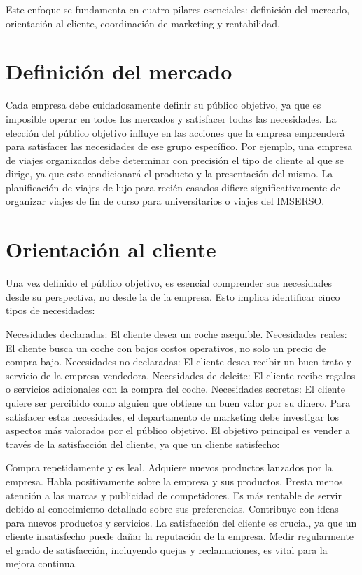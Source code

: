 \documentclass[
    a4paper, %
    10pt, %
    unnumberedsections, %
    twoside, %
]{LTJournalArticle}
\begin{document}
Este enfoque se fundamenta en cuatro pilares esenciales: definición del mercado, orientación al cliente, coordinación de marketing y rentabilidad.



\section{Definición del mercado}

Cada empresa debe cuidadosamente definir su público objetivo, ya que es imposible operar en todos los mercados y satisfacer todas las necesidades. La elección del público objetivo influye en las acciones que la empresa emprenderá para satisfacer las necesidades de ese grupo específico. Por ejemplo, una empresa de viajes organizados debe determinar con precisión el tipo de cliente al que se dirige, ya que esto condicionará el producto y la presentación del mismo. La planificación de viajes de lujo para recién casados difiere significativamente de organizar viajes de fin de curso para universitarios o viajes del IMSERSO.


\section{Orientación al cliente}

Una vez definido el público objetivo, es esencial comprender sus necesidades desde su perspectiva, no desde la de la empresa. Esto implica identificar cinco tipos de necesidades:

Necesidades declaradas: El cliente desea un coche asequible.
Necesidades reales: El cliente busca un coche con bajos costos operativos, no solo un precio de compra bajo.
Necesidades no declaradas: El cliente desea recibir un buen trato y servicio de la empresa vendedora.
Necesidades de deleite: El cliente recibe regalos o servicios adicionales con la compra del coche.
Necesidades secretas: El cliente quiere ser percibido como alguien que obtiene un buen valor por su dinero.
Para satisfacer estas necesidades, el departamento de marketing debe investigar los aspectos más valorados por el público objetivo. El objetivo principal es vender a través de la satisfacción del cliente, ya que un cliente satisfecho:

Compra repetidamente y es leal.
Adquiere nuevos productos lanzados por la empresa.
Habla positivamente sobre la empresa y sus productos.
Presta menos atención a las marcas y publicidad de competidores.
Es más rentable de servir debido al conocimiento detallado sobre sus preferencias.
Contribuye con ideas para nuevos productos y servicios.
La satisfacción del cliente es crucial, ya que un cliente insatisfecho puede dañar la reputación de la empresa. Medir regularmente el grado de satisfacción, incluyendo quejas y reclamaciones, es vital para la mejora continua.
\end{document}
